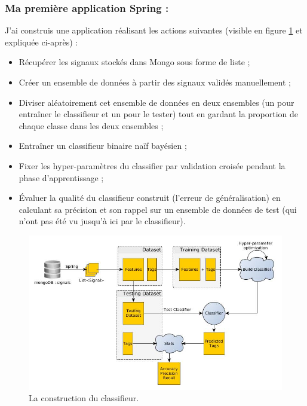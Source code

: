             \subsubsection{Ma première application Spring :}
                J'ai construis une application réalisant les actions suivantes (visible en figure \ref{fig:classif_building} et expliquée ci-après) :
            \begin{itemize}
                \item Récupérer les signaux stockés dans Mongo sous forme de liste ;
                \item Créer un ensemble de données à partir des signaux validés manuellement ;
                \item Diviser aléatoirement cet ensemble de données en deux ensembles (un pour entraîner le classifieur et un pour le tester) tout en gardant la proportion de chaque classe dans les deux ensembles ;
                \item Entraîner un classifieur binaire naïf bayésien ;
                \item Fixer les hyper-paramètres du classifier par validation croisée pendant la phase d'apprentissage ;
                \item Évaluer la qualité du classifieur construit (l'erreur de généralisation) en calculant sa précision et son rappel sur un ensemble de données de test (qui n'ont pas \og été vu \fg jusqu'à ici par le classifieur).
            \end{itemize}

            \begin{figure}[h!]
                \centering
                \includegraphics[width=\textwidth]{images/classifier_building.jpg}
                \caption{La construction du classifieur.}
                \label{fig:classif_building}
            \end{figure}

